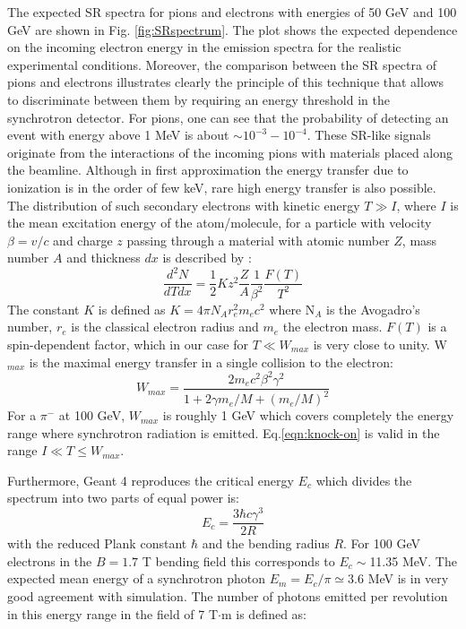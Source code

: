 The expected SR spectra for pions and electrons with energies of 50 GeV and 100 GeV are shown in Fig. \ref{fig:SRspectrum}. The plot shows the expected dependence on the incoming electron energy in the emission spectra for the realistic experimental conditions. Moreover, the comparison between the SR spectra of pions and electrons illustrates clearly the principle of this technique that allows to discriminate between them by requiring an energy threshold in the synchrotron detector.  For pions, one can see that the probability of detecting an event with energy above 1 MeV is about $\sim 10^{-3}-10^{-4}$.
These SR-like signals originate from the interactions of the incoming pions with materials placed along the beamline. Although in first approximation the energy transfer due to ionization is in the order of few \si{\kilo\electronvolt}, rare high energy transfer is also possible. The distribution of such secondary electrons with
kinetic energy $T\gg I$, where $I$ is the mean excitation energy of the
atom/molecule, for a particle with velocity $\beta=v/c$ and charge $z$
passing through a material with atomic number $Z$, mass number $A$ and
thickness $dx$ is described by \cite{review-particle-physics}:
\begin{equation}
\frac{d^2N}{dTdx} = \frac{1}{2}K z^2 \frac{Z}{A}
\frac{1}{\beta^2}\frac{F(T)}{T^2}
\label{eqn:knock-on}
\end{equation}
The constant $K$ is defined as $K=4\pi N_A r_e^2 m_e c^2$ where N$_A$ is
the Avogadro's number, $r_e$ is the classical electron radius and $m_e$
the electron mass.
$F(T)$ is a spin-dependent factor, which in our case for $T \ll W_{max}$
is very close to unity. W$_{max}$ is the maximal energy transfer in a single collision to the
electron:
\begin{equation}
W_{max} = \frac{2m_e c^2 \beta^2 \gamma^2}{1+ 2\gamma m_e/M+(m_e/M)^2}
\end{equation}
For a $\pi^-$ at 100 GeV, $W_{max}$ is roughly 1 GeV which
covers completely the energy range where synchrotron radiation is
emitted. Eq.\ref{eqn:knock-on} is valid in the range $I\ll T \leq W_{max}$.
 \par 
Furthermore, Geant 4 reproduces the critical energy $E_c$ which divides the spectrum into two parts of equal power is:
\begin{equation}
E_c = \frac{3 \hbar c \gamma^3}{2R}
\end{equation}
with the reduced Plank constant $\hbar$ and the bending radius $R$. 
 For 100 GeV electrons in the  $B=1.7$ T bending field this corresponds to $E_c\sim$11.35 MeV. The expected mean energy of a synchrotron photon $E_m=E_c/\pi\simeq 3.6$ MeV is in very good agreement with simulation. The number of photons emitted per revolution in this energy range in the field of 7 T$\cdot$m is defined as:
